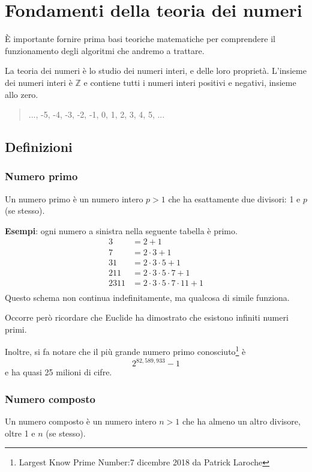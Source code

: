 \documentclass[a4paper,12pt]{report}
\begin{document}
\chapter{Fondamenti della teoria dei numeri}
È importante fornire prima basi teoriche matematiche per comprendere il funzionamento degli algoritmi che andremo a trattare.

La teoria dei numeri è lo studio dei numeri interi, e delle loro proprietà. L'insieme dei numeri interi è $\mathbb{Z}$ e contiene tutti i numeri interi positivi e negativi, insieme allo zero.
\begin{quote}
	\centering
	..., -5, -4, -3, -2, -1,  0,  1,  2,  3,  4,  5, ...
\end{quote}

\section{Definizioni}

\subsection*{Numero primo}
Un numero primo è un numero intero \( p > 1 \) che ha esattamente due divisori: 1 e \(p\) (se stesso).

\textbf{Esempi}: ogni numero a sinistra nella seguente tabella è primo.
\[\begin{array}{ll}
3 & = 2 + 1 \\
7 & = 2 \cdot 3 + 1 \\
31 & = 2 \cdot 3 \cdot 5 + 1 \\
211 & = 2 \cdot 3 \cdot 5 \cdot 7 + 1 \\
2311 & = 2 \cdot 3 \cdot 5 \cdot 7 \cdot 11 + 1 \\
\end{array}\]
Questo schema non continua indefinitamente, ma qualcosa di simile funziona.

Occorre però ricordare che Euclide ha dimostrato che esistono infiniti numeri primi. \cite{stein2008}

Inoltre, si fa notare che il più grande numero primo conosciuto\footnote{Largest Know Prime Number:7 dicembre 2018 da Patrick Laroche} è \[2^{82,589,933} - 1\]
e ha quasi 25 milioni di cifre.

\subsection*{Numero composto}
Un numero composto è un numero intero \( n > 1 \) che ha almeno un altro divisore, oltre 1 e \( n \) (se stesso).
\end{document}
